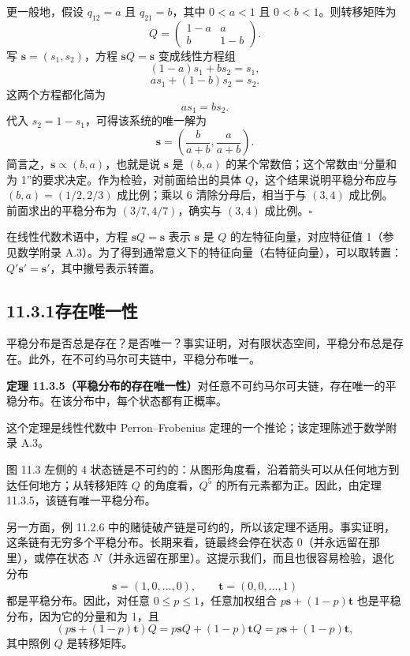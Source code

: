 \documentclass[UTF8, 12pt, fontset=fandol, oneside]{ctexart}
\begin{document}
更一般地，假设 $q_{12}=a$ 且 $q_{21}=b$，其中 $0<a<1$ 且 $0<b<1$。则转移矩阵为
\[
  Q=
  \begin{pmatrix}
    1-a & a\\
    b & 1-b
  \end{pmatrix}.
\]
写 $\mathbf s=(s_1,s_2)$，方程 $\mathbf sQ=\mathbf s$ 变成线性方程组
\[
  (1-a)s_1+bs_2=s_1,
\]
\[
  as_1+(1-b)s_2=s_2.
\]
这两个方程都化简为
\[
  as_1=bs_2.
\]
代入 $s_2=1-s_1$，可得该系统的唯一解为
\[
  \mathbf s=\left(\frac{b}{a+b},\frac{a}{a+b}\right).
\]
简言之，$\mathbf s\propto(b,a)$，也就是说 $\mathbf s$ 是 $(b,a)$ 的某个常数倍；这个常数由“分量和为 1”的要求决定。作为检验，对前面给出的具体 $Q$，这个结果说明平稳分布应与 $(b,a)=(1/2,2/3)$ 成比例；乘以 6 清除分母后，相当于与 $(3,4)$ 成比例。前面求出的平稳分布为 $(3/7,4/7)$，确实与 $(3,4)$ 成比例。$\square$

在线性代数术语中，方程 $\mathbf sQ=\mathbf s$ 表示 $\mathbf s$ 是 $Q$ 的左特征向量，对应特征值 1（参见数学附录 A.3）。为了得到通常意义下的特征向量（右特征向量），可以取转置：$Q'\mathbf s'=\mathbf s'$，其中撇号表示转置。

\subsection*{11.3.1\quad 存在唯一性}

平稳分布是否总是存在？是否唯一？事实证明，对有限状态空间，平稳分布总是存在。此外，在不可约马尔可夫链中，平稳分布唯一。

\noindent\textbf{定理 11.3.5（平稳分布的存在唯一性）}\quad 对任意不可约马尔可夫链，存在唯一的平稳分布。在该分布中，每个状态都有正概率。

这个定理是线性代数中 Perron--Frobenius 定理的一个推论；该定理陈述于数学附录 A.3。

图 11.3 左侧的 4 状态链是不可约的：从图形角度看，沿着箭头可以从任何地方到达任何地方；从转移矩阵 $Q$ 的角度看，$Q^5$ 的所有元素都为正。因此，由定理 11.3.5，该链有唯一平稳分布。

另一方面，例 11.2.6 中的赌徒破产链是可约的，所以该定理不适用。事实证明，这条链有无穷多个平稳分布。长期来看，链最终会停在状态 0（并永远留在那里），或停在状态 $N$（并永远留在那里）。这提示我们，而且也很容易检验，退化分布
\[
  \mathbf s=(1,0,\ldots,0),\qquad \mathbf t=(0,0,\ldots,1)
\]
都是平稳分布。因此，对任意 $0\le p\le1$，任意加权组合 $p\mathbf s+(1-p)\mathbf t$ 也是平稳分布，因为它的分量和为 1，且
\[
  (p\mathbf s+(1-p)\mathbf t)Q
  =
  p\mathbf sQ+(1-p)\mathbf tQ
  =
  p\mathbf s+(1-p)\mathbf t,
\]
其中照例 $Q$ 是转移矩阵。
\end{document}
